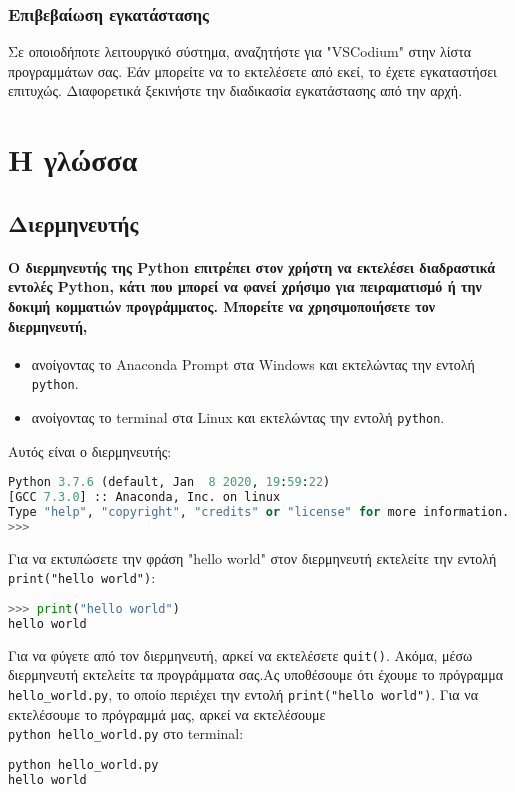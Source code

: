 \documentclass[a4paper,14pt]{extreport}
\begin{document}
\subsubsection{Επιβεβαίωση εγκατάστασης}
Σε οποιοδήποτε λειτουργικό σύστημα, αναζητήστε για "VSCodium" στην λίστα
προγραμμάτων σας. Εάν μπορείτε να το εκτελέσετε από εκεί, το έχετε εγκαταστήσει
επιτυχώς. Διαφορετικά ξεκινήστε την διαδικασία εγκατάστασης από την αρχή.
\section{Η γλώσσα}
\subsection{Διερμηνευτής}
\paragraph{
    Ο διερμηνευτής της Python επιτρέπει στον χρήστη να εκτελέσει διαδραστικά
    εντολές Python, κάτι που μπορεί να φανεί χρήσιμο για πειραματισμό ή
    την δοκιμή κομματιών προγράμματος. Μπορείτε να χρησιμοποιήσετε τον
    διερμηνευτή,
}
\begin{itemize}
    \item ανοίγοντας το Anaconda Prompt στα Windows και εκτελώντας την εντολή
          \lstinline{python}.
    \item ανοίγοντας το terminal στα Linux και εκτελώντας την εντολή
          \lstinline{python}.
\end{itemize}
Αυτός είναι ο διερμηνευτής:
\begin{lstlisting}[language=Python]
Python 3.7.6 (default, Jan  8 2020, 19:59:22)
[GCC 7.3.0] :: Anaconda, Inc. on linux
Type "help", "copyright", "credits" or "license" for more information.
>>>
\end{lstlisting}
Για να εκτυπώσετε την φράση "hello world" στον διερμηνευτή εκτελείτε  την
εντολή \\
\lstinline{print("hello world")}:
\begin{lstlisting}[language=Python]
>>> print("hello world")
hello world
\end{lstlisting}
Για να φύγετε από τον διερμηνευτή, αρκεί να εκτελέσετε
\lstinline{quit()}.
Ακόμα, μέσω διερμηνευτή εκτελείτε τα προγράμματα σας.Ας υποθέσουμε ότι
έχουμε το πρόγραμμα \lstinline{hello_world.py},
το οποίο περιέχει την εντολή \lstinline{print("hello world")}.
Για να εκτελέσουμε το πρόγραμμά μας, αρκεί να εκτελέσουμε \\
\lstinline{python hello_world.py}
στο terminal:
\begin{lstlisting}[language=Python]
python hello_world.py
hello world    
\end{lstlisting}
\end{document}
